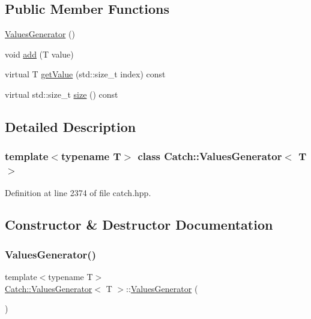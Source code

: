 \subsection*{Public Member Functions}
\begin{DoxyCompactItemize}
\item 
\hyperlink{class_catch_1_1_values_generator_a36cd3d75afb1f5502400c3ad7cae7a5e}{Values\+Generator} ()
\item 
void \hyperlink{class_catch_1_1_values_generator_a8412c8ce5d9d4fc6ff06d5246d56d538}{add} (T value)
\item 
virtual T \hyperlink{class_catch_1_1_values_generator_a9674c8b70d562d2d68154de92dd1810a}{get\+Value} (std\+::size\+\_\+t index) const
\item 
virtual std\+::size\+\_\+t \hyperlink{class_catch_1_1_values_generator_a9aa5b140ee502975cf35115e534ab771}{size} () const
\end{DoxyCompactItemize}


\subsection{Detailed Description}
\subsubsection*{template$<$typename T$>$\newline
class Catch\+::\+Values\+Generator$<$ T $>$}



Definition at line 2374 of file catch.\+hpp.



\subsection{Constructor \& Destructor Documentation}
\hypertarget{class_catch_1_1_values_generator_a36cd3d75afb1f5502400c3ad7cae7a5e}{}\label{class_catch_1_1_values_generator_a36cd3d75afb1f5502400c3ad7cae7a5e} 
\subsubsection{\texorpdfstring{Values\+Generator()}{ValuesGenerator()}}
{\footnotesize\ttfamily template$<$typename T$>$ \\
\hyperlink{class_catch_1_1_values_generator}{Catch\+::\+Values\+Generator}$<$ T $>$\+::\hyperlink{class_catch_1_1_values_generator}{Values\+Generator} (\begin{DoxyParamCaption}{ }\end{DoxyParamCaption})\hspace{0.3cm}{\ttfamily [inline]}}



